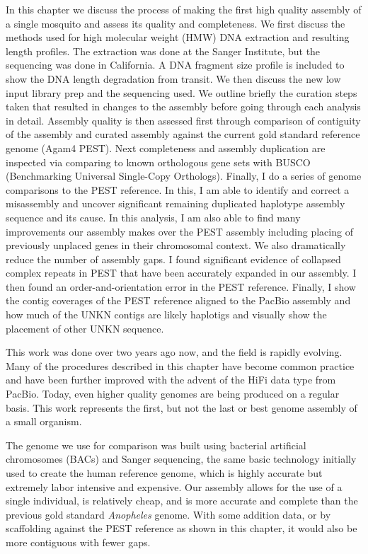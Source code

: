 \par{
In this chapter we discuss the process of making the first high quality assembly of a single mosquito and assess its quality and completeness. We first discuss the methods used for high molecular weight (HMW) DNA extraction and resulting length profiles. The extraction was done at the Sanger Institute, but the sequencing was done in California. A DNA fragment size profile is included to show the DNA length degradation from transit. We then discuss the new low input library prep and the sequencing used. We outline briefly the curation steps taken that resulted in changes to the assembly before going through each analysis in detail. Assembly quality is then assessed first through comparison of contiguity of the assembly and curated assembly against the current gold standard reference genome (Agam4 PEST). Next completeness and assembly duplication are inspected via comparing to known orthologous gene sets with BUSCO (Benchmarking Universal Single-Copy Orthologs). Finally, I do a series of genome comparisons to the PEST reference. In this, I am able to identify and correct a misassembly and uncover significant remaining duplicated haplotype assembly sequence and its cause. In this analysis, I am also able to find many improvements our assembly makes over the PEST assembly including placing of previously unplaced genes in their chromosomal context. We also dramatically reduce the number of assembly gaps. I found significant evidence of collapsed complex repeats in PEST that have been accurately expanded in our assembly. I then found an order-and-orientation error in the PEST reference. Finally, I show the contig coverages of the PEST reference aligned to the PacBio assembly and how much of the UNKN contigs are likely haplotigs and visually show the placement of other UNKN sequence.
} 

\par{
This work was done over two years ago now, and the field is rapidly evolving. Many of the procedures described in this chapter have become common practice and have been further improved with the advent of the HiFi data type from PacBio. Today, even higher quality genomes are being produced on a regular basis. This work represents the first, but not the last or best genome assembly of a small organism.
}

\par{
The genome we use for comparison was built using bacterial artificial chromosomes (BACs) and Sanger sequencing, the same basic technology initially used to create the human reference genome, which is highly accurate but extremely labor intensive and expensive. Our assembly allows for the use of a single individual, is relatively cheap, and is more accurate and complete than the previous gold standard \textit{Anopheles} genome. With some addition data, or by scaffolding against the PEST reference as shown in this chapter, it would also be more contiguous with fewer gaps.
}

